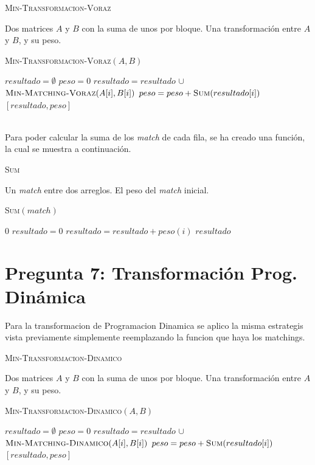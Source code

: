 \documentclass[conference]{IEEEtran}
\begin{document}
\begin{algorithm}
\caption{\textsc{Min-Transformacion-Voraz}}
\scriptsize
\begin{algorithmic}
\REQUIRE Dos matrices $A$ y $B$ con la suma de unos por bloque.
\ENSURE Una transformación entre $A$ y $B$, y su peso.
\begin{flushleft}
\textsc{Min-Transformacion-Voraz}$(A,B)$
\end{flushleft}
    \STATE $resultado=\emptyset$
    \STATE $peso=0$
        \STATE $resultado=resultado$ $\cup$ $\textsc{Min-Matching-Voraz}(A[i],B[i])$
    \ENDFOR
        \STATE $peso=peso+\textsc{Sum}(resultado[i])$
    \ENDFOR
    \RETURN $[resultado,peso]$
\end{algorithmic}
\label{alg:min-transformacion-voraz}
\end{algorithm}
\verb||\\
Para poder calcular la suma de los \textit{match} de cada fila, se ha creado una función, la cual se muestra a continuación.

\begin{algorithm}
\caption{\textsc{Sum}}
\scriptsize
\begin{algorithmic}
\REQUIRE Un \textit{match} entre dos arreglos.
\ENSURE El peso del \textit{match} inicial.
\begin{flushleft}
\textsc{Sum}$(match)$
\end{flushleft}
        \RETURN $0$
    \ENDIF
    \STATE $resultado=0$
        \STATE $resultado=resultado+peso(i)$
    \ENDFOR
    \RETURN $resultado$
\end{algorithmic}
\label{alg:sum}
\end{algorithm}

\section{Pregunta 7: Transformación Prog. Dinámica}
Para la transformacion de Programacion Dinamica se aplico la misma estrategis vista previamente simplemente reemplazando la funcion que haya los matchings.

\begin{algorithm}
\caption{\textsc{Min-Transformacion-Dinamico}}
\scriptsize
\begin{algorithmic}
\REQUIRE Dos matrices $A$ y $B$ con la suma de unos por bloque.
\ENSURE Una transformación entre $A$ y $B$, y su peso.
\begin{flushleft}
\textsc{Min-Transformacion-Dinamico}$(A,B)$
\end{flushleft}
    \STATE $resultado=\emptyset$
    \STATE $peso=0$
        \STATE $resultado=resultado$ $\cup$ $\textsc{Min-Matching-Dinamico}(A[i],B[i])$
    \ENDFOR
        \STATE $peso=peso+\textsc{Sum}(resultado[i])$
    \ENDFOR
    \RETURN $[resultado,peso]$
\end{algorithmic}
\label{alg:min-transformacion-dinamico}
\end{algorithm}
\end{document}
